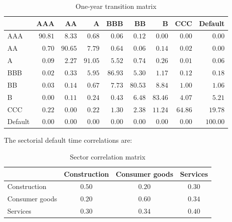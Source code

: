 \documentclass[a4paper,12pt,final]{article}
\begin{document}
\begin{table}[!h]
\begin{center}
\begin{tabular}[]{l|rrrrrrrr}
        &      AAA &       AA &        A &      BBB &       BB &        B &      CCC &  Default \\
\hline
AAA     &  $90.81$ &   $8.33$ &   $0.68$ &   $0.06$ &   $0.12$ &   $0.00$ &   $0.00$ &   $0.00$ \\
 AA     &   $0.70$ &  $90.65$ &   $7.79$ &   $0.64$ &   $0.06$ &   $0.14$ &   $0.02$ &   $0.00$ \\
  A     &   $0.09$ &   $2.27$ &  $91.05$ &   $5.52$ &   $0.74$ &   $0.26$ &   $0.01$ &   $0.06$ \\
BBB     &   $0.02$ &   $0.33$ &   $5.95$ &  $86.93$ &   $5.30$ &   $1.17$ &   $0.12$ &   $0.18$ \\
 BB     &   $0.03$ &   $0.14$ &   $0.67$ &   $7.73$ &  $80.53$ &   $8.84$ &   $1.00$ &   $1.06$ \\
  B     &   $0.00$ &   $0.11$ &   $0.24$ &   $0.43$ &   $6.48$ &  $83.46$ &   $4.07$ &   $5.21$ \\
CCC     &   $0.22$ &   $0.00$ &   $0.22$ &   $1.30$ &   $2.38$ &  $11.24$ &  $64.86$ &  $19.78$ \\
Default &   $0.00$ &   $0.00$ &   $0.00$ &   $0.00$ &   $0.00$ &   $0.00$ &   $0.00$ & $100.00$ \\
\end{tabular}
\caption{One-year transition matrix}
\label{example.tmatrix}
\end{center}
\end{table}
\FloatBarrier

The sectorial default time correlations are:

\begin{table}[!h]
\begin{center}
\begin{tabular}[]{l|ccc}
               & Construction & Consumer goods & Services \\
\hline
Construction   &    $0.50$    &     $0.20$     &   $0.30$ \\
Consumer goods &    $0.20$    &     $0.60$     &   $0.34$ \\
Services       &    $0.30$    &     $0.34$     &   $0.40$ \\
\end{tabular}
\caption{Sector correlation matrix}
\label{example.scorrels}
\end{center}
\end{table}
\FloatBarrier
\end{document}
